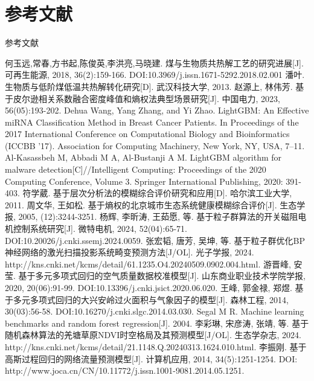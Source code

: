 \documentclass{beamer}
\begin{document}
\section*{参考文献}
\begin{frame}[allowframebreaks]{参考文献}
    \tiny
    \begin{thebibliography}{9}  
         何玉远,常春,方书起,陈俊英,李洪亮,马晓建. 煤与生物质共热解工艺的研究进展[J]. 可再生能源, 2018, 36(2):159-166. DOI:10.3969/j.issn.1671-5292.2018.02.001    
         潘叶. 生物质与低阶煤低温共热解转化研究[D]. 武汉科技大学, 2013.
         赵源上, 林伟芳. 基于皮尔逊相关系数融合密度峰值和熵权法典型场景研究[J]. 中国电力, 2023, 56(05):193-202.
         Dehua Wang, Yang Zhang, and Yi Zhao. LightGBM: An Effective miRNA Classification Method in Breast Cancer Patients. In Proceedings of the 2017 International Conference on Computational Biology and Bioinformatics (ICCBB '17). Association for Computing Machinery, New York, NY, USA, 7–11.
         Al-Kasassbeh M, Abbadi M A, Al-Bustanji A M. LightGBM algorithm for malware detection[C]//Intelligent Computing: Proceedings of the 2020 Computing Conference, Volume 3. Springer International Publishing, 2020: 391-403.
         符学葳. 基于层次分析法的模糊综合评价研究和应用[D]. 哈尔滨工业大学, 2011.
         周文华, 王如松. 基于熵权的北京城市生态系统健康模糊综合评价[J]. 生态学报, 2005, (12):3244-3251.
         杨辉, 李昕涛, 王茹愿, 等. 基于粒子群算法的开关磁阻电机控制系统研究[J]. 微特电机, 2024, 52(04):65-71. DOI:10.20026/j.cnki.ssemj.2024.0059.
         张宏韬, 唐芳, 吴坤, 等. 基于粒子群优化BP神经网络的激光扫描投影系统畸变预测方法[J/OL]. 光子学报, 2024. http://kns.cnki.net/kcms/detail/61.1235.O4.20240509.0902.004.html.
         游晋峰, 安莹. 基于多元多项式回归的空气质量数据校准模型[J]. 山东商业职业技术学院学报, 2020, 20(06):91-99. DOI:10.13396/j.cnki.jsict.2020.06.020.
         王峰, 郭金禄, 郑煜. 基于多元多项式回归的大兴安岭过火面积与气象因子的模型[J]. 森林工程, 2014, 30(03):56-58. DOI:10.16270/j.cnki.slgc.2014.03.030.
         Segal M R. Machine learning benchmarks and random forest regression[J]. 2004.
         李彩琳, 宋彦涛, 张靖, 等. 基于随机森林算法的羌塘草原NDVI时空格局及其预测模型[J/OL]. 生态学杂志, 2024. http://kns.cnki.net/kcms/detail/21.1148.Q.20240313.1624.010.html.
         李振刚. 基于高斯过程回归的网络流量预测模型[J]. 计算机应用, 2014, 34(5):1251-1254. DOI: http://www.joca.cn/CN/10.11772/j.issn.1001-9081.2014.05.1251.
    \end{thebibliography}
\end{frame}
\end{document}
